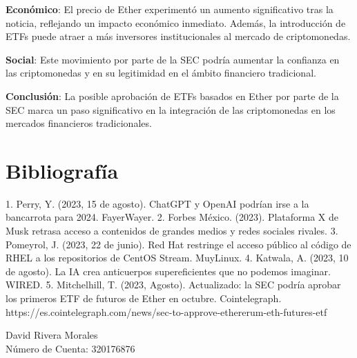 \documentclass{article}
\begin{document}
\textbf{Económico}: El precio de Ether experimentó un aumento significativo tras la noticia, reflejando un impacto económico inmediato. Además, la introducción de ETFs puede atraer a más inversores institucionales al mercado de criptomonedas.

\textbf{Social}: Este movimiento por parte de la SEC podría aumentar la confianza en las criptomonedas y en su legitimidad en el ámbito financiero tradicional.

\textbf{Conclusión}: La posible aprobación de ETFs basados en Ether por parte de la SEC marca un paso significativo en la integración de las criptomonedas en los mercados financieros tradicionales.

\section*{Bibliografía}

1. Perry, Y. (2023, 15 de agosto). ChatGPT y OpenAI podrían irse a la bancarrota para 2024. FayerWayer.
2. Forbes México. (2023). Plataforma X de Musk retrasa acceso a contenidos de grandes medios y redes sociales rivales.
3. Pomeyrol, J. (2023, 22 de junio). Red Hat restringe el acceso público al código de RHEL a los repositorios de CentOS Stream. MuyLinux.
4. Katwala, A. (2023, 10 de agosto). La IA crea anticuerpos supereficientes que no podemos imaginar. WIRED.
5. Mitchelhill, T. (2023, Agosto). Actualizado: la SEC podría aprobar los primeros ETF de futuros de Ether en octubre. Cointelegraph. https://es.cointelegraph.com/news/sec-to-approve-ethererum-eth-futures-etf

\vspace{1cm}
\noindent
David Rivera Morales \\
Número de Cuenta: 320176876
\end{document}
